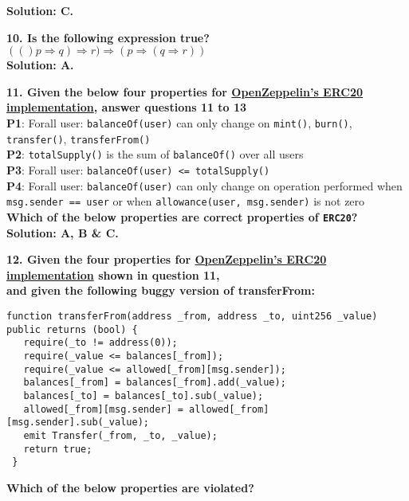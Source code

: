 \textbf{Solution: C.}

\textbf{10. Is the following expression true? $(()p\Rightarrow q)\Rightarrow r)\Rightarrow(p\Rightarrow (q\Rightarrow r))$}\label{sec:raceXcertora_q10}\\

\textbf{Solution: A.}

\textbf{11. Given the below four properties for \href{https://github.com/OpenZeppelin/openzeppelin-contracts/blob/master/contracts/token/ERC20/ERC20.sol}{OpenZeppelin's ERC20 implementation}, answer questions 11 to 13}\\

\textbf{P1}: Forall user: \verb|balanceOf(user)| can only change on \verb|mint()|, \verb|burn()|, \verb|transfer()|, \verb|transferFrom()|\\
\textbf{P2}: \verb|totalSupply()| is the sum of \verb|balanceOf()| over all users\\
\textbf{P3}: Forall user: \verb|balanceOf(user) <= totalSupply()|\\
\textbf{P4}: Forall user: \verb|balanceOf(user)| can only change on operation performed when \verb|msg.sender == user| or when \verb|allowance(user, msg.sender)| is not zero\\

\textbf{Which of the below properties are correct properties of \texttt{ERC20}?}\label{sec:raceXcertora_q11}\\

\textbf{Solution: A, B \& C.}

\textbf{12. Given the four properties for \href{https://github.com/OpenZeppelin/openzeppelin-contracts/blob/master/contracts/token/ERC20/ERC20.sol}{OpenZeppelin's ERC20 implementation} shown in question 11,\\ and given the following buggy version of transferFrom:}

\begin{lstlisting}[language=Solidity, style=solStyle]
function transferFrom(address _from, address _to, uint256 _value) public returns (bool) {
   require(_to != address(0));
   require(_value <= balances[_from]);
   require(_value <= allowed[_from][msg.sender]);
   balances[_from] = balances[_from].add(_value);
   balances[_to] = balances[_to].sub(_value);
   allowed[_from][msg.sender] = allowed[_from][msg.sender].sub(_value);
   emit Transfer(_from, _to, _value);
   return true;
 }
\end{lstlisting}

\textbf{Which of the below properties are violated?}\label{sec:raceXcertora_q12}\\

